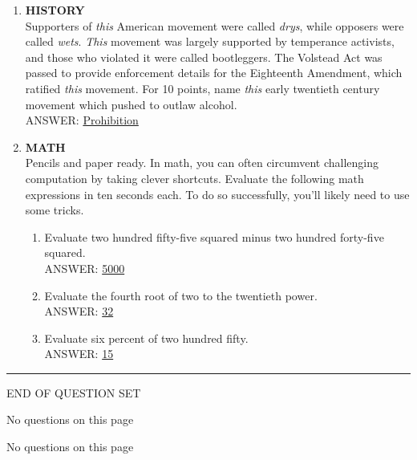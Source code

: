 \documentclass{report}
\newcommand*{\backtrack}{\setcounter{enumi}{\numexpr\theenumi-1\relax}}
\begin{document}
\begin{enumerate}
    \item \textbf{HISTORY} \\ Supporters of \textit{this} American movement were called \textit{drys}, while opposers were called \textit{wets}. \textit{This} movement was largely supported by temperance activists, and those who violated it were called bootleggers. The Volstead Act was passed to provide enforcement details for the Eighteenth Amendment, which ratified \textit{this} movement. For 10 points, name \textit{this} early twentieth century movement which pushed to outlaw alcohol. \\ ANSWER: \underline{Prohibition} \backtrack
    \item \textbf{MATH} \\ Pencils and paper ready. In math, you can often circumvent challenging computation by taking clever shortcuts. Evaluate the following math expressions in ten seconds each. To do so successfully, you'll likely need to use some tricks.
    \begin{enumerate}[label=\Alph*]
        \item Evaluate two hundred fifty-five squared minus two hundred forty-five squared. \\ ANSWER: \underline{5000}
        \item Evaluate the fourth root of two to the twentieth power. \\ ANSWER: \underline{32}
        \item Evaluate six percent of two hundred fifty. \\ ANSWER: \underline{15}
    \end{enumerate}


\end{enumerate}


\vspace*{0.5 cm}
\centering
\rule{10 cm}{0.4pt}

\Large
END OF QUESTION SET
\newpage

\vspace*{\fill}
\centering
\thispagestyle{empty}
\Large
No questions on this page
\vspace*{\fill}

\newpage

\vspace*{\fill}
\centering
\thispagestyle{empty}
\Large
No questions on this page
\vspace*{\fill}
\end{document}

